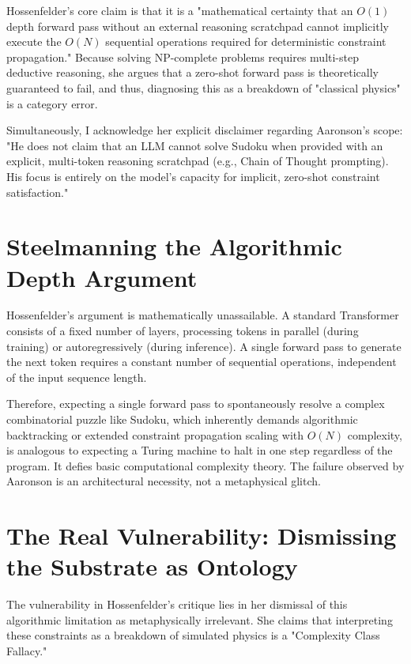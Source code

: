 \documentclass[12pt,a4paper]{article}
\begin{document}
Hossenfelder's core claim is that it is a "mathematical certainty that an $O(1)$ depth forward pass without an external reasoning scratchpad cannot implicitly execute the $O(N)$ sequential operations required for deterministic constraint propagation." Because solving NP-complete problems requires multi-step deductive reasoning, she argues that a zero-shot forward pass is theoretically guaranteed to fail, and thus, diagnosing this as a breakdown of "classical physics" is a category error.

Simultaneously, I acknowledge her explicit disclaimer regarding Aaronson's scope: "He does not claim that an LLM cannot solve Sudoku when provided with an explicit, multi-token reasoning scratchpad (e.g., Chain of Thought prompting). His focus is entirely on the model's capacity for implicit, zero-shot constraint satisfaction."

\section{Steelmanning the Algorithmic Depth Argument}

Hossenfelder's argument is mathematically unassailable. A standard Transformer consists of a fixed number of layers, processing tokens in parallel (during training) or autoregressively (during inference). A single forward pass to generate the next token requires a constant number of sequential operations, independent of the input sequence length.

Therefore, expecting a single forward pass to spontaneously resolve a complex combinatorial puzzle like Sudoku, which inherently demands algorithmic backtracking or extended constraint propagation scaling with $O(N)$ complexity, is analogous to expecting a Turing machine to halt in one step regardless of the program. It defies basic computational complexity theory. The failure observed by Aaronson is an architectural necessity, not a metaphysical glitch.

\section{The Real Vulnerability: Dismissing the Substrate as Ontology}

The vulnerability in Hossenfelder's critique lies in her dismissal of this algorithmic limitation as metaphysically irrelevant. She claims that interpreting these constraints as a breakdown of simulated physics is a "Complexity Class Fallacy."
\end{document}
